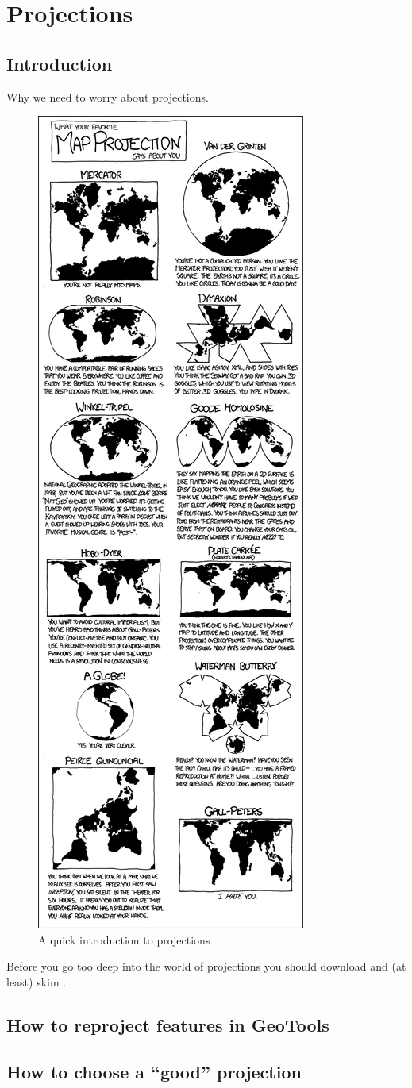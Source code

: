 \chapter{Projections}
\section{Introduction}
Why we need to worry about projections.
\begin{figure}[htbp]
\includegraphics[height=\textheight]{map_projections}
\caption{A quick introduction to projections}
\label{xkcd-projections}
\end{figure}
Before you go too deep into the world of projections you should download and (at least) skim \cite{snyder}.
\section{How to reproject features in GeoTools}
\section{How to choose a ``good'' projection}